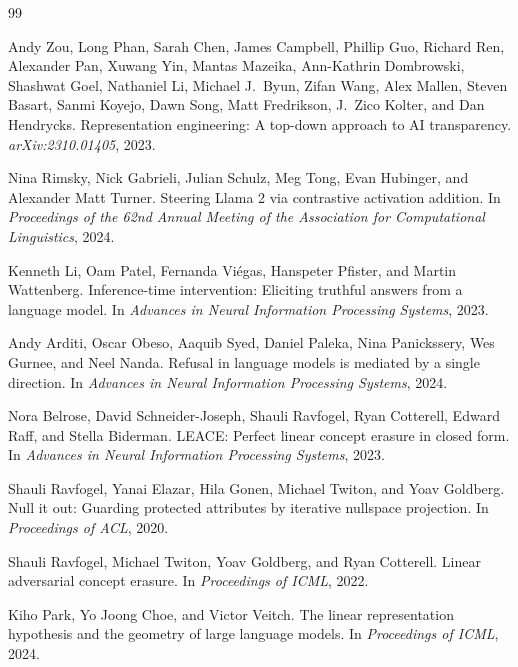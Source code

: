 \documentclass[11pt,letterpaper]{article}
\theoremstyle{plain}
\theoremstyle{definition}
\newcommand{\1}{\mathbf{1}}
\begin{document}

\begin{thebibliography}{99}

Andy Zou, Long Phan, Sarah Chen, James Campbell, Phillip Guo, Richard Ren, Alexander Pan, Xuwang Yin, Mantas Mazeika, Ann-Kathrin Dombrowski, Shashwat Goel, Nathaniel Li, Michael J.\ Byun, Zifan Wang, Alex Mallen, Steven Basart, Sanmi Koyejo, Dawn Song, Matt Fredrikson, J.\ Zico Kolter, and Dan Hendrycks.
\newblock Representation engineering: A top-down approach to AI transparency.
\newblock \emph{arXiv:2310.01405}, 2023.

Nina Rimsky, Nick Gabrieli, Julian Schulz, Meg Tong, Evan Hubinger, and Alexander Matt Turner.
\newblock Steering Llama 2 via contrastive activation addition.
\newblock In \emph{Proceedings of the 62nd Annual Meeting of the Association for Computational Linguistics}, 2024.

Kenneth Li, Oam Patel, Fernanda Vi\'egas, Hanspeter Pfister, and Martin Wattenberg.
\newblock Inference-time intervention: Eliciting truthful answers from a language model.
\newblock In \emph{Advances in Neural Information Processing Systems}, 2023.

Andy Arditi, Oscar Obeso, Aaquib Syed, Daniel Paleka, Nina Panickssery, Wes Gurnee, and Neel Nanda.
\newblock Refusal in language models is mediated by a single direction.
\newblock In \emph{Advances in Neural Information Processing Systems}, 2024.

Nora Belrose, David Schneider-Joseph, Shauli Ravfogel, Ryan Cotterell, Edward Raff, and Stella Biderman.
\newblock LEACE: Perfect linear concept erasure in closed form.
\newblock In \emph{Advances in Neural Information Processing Systems}, 2023.

Shauli Ravfogel, Yanai Elazar, Hila Gonen, Michael Twiton, and Yoav Goldberg.
\newblock Null it out: Guarding protected attributes by iterative nullspace projection.
\newblock In \emph{Proceedings of ACL}, 2020.

Shauli Ravfogel, Michael Twiton, Yoav Goldberg, and Ryan Cotterell.
\newblock Linear adversarial concept erasure.
\newblock In \emph{Proceedings of ICML}, 2022.

Kiho Park, Yo Joong Choe, and Victor Veitch.
\newblock The linear representation hypothesis and the geometry of large language models.
\newblock In \emph{Proceedings of ICML}, 2024.


\end{thebibliography}
\end{document}
